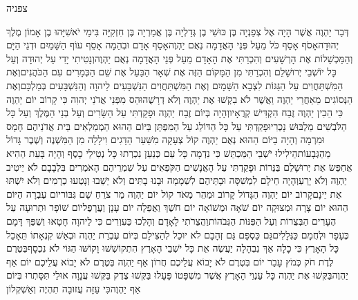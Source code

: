 \documentclass[../main/main.tex]{subfiles}
\begin{document}
\Incipit{}צפניה\par
\vspace{\afterchapskip}
\RTLmulticolcolumns
\begin{multicols}{\ncols}
דְּבַר יַהְוֶה אֲשֶׁר הָיָה אֶל צְפַנְיָה בֶּן כּוּשִׁי בֶן גְּדַלְיָה בֶּן אֲמַרְיָה בֶּן חִזְקִיָּה בִּימֵי יֹאשִׁיָּהוּ בֶן אָמוֹן מֶלֶךְ יְהוּדָה\PreVerseSpace{}אָסֹף אָסֵף כֹּל מֵעַל פְּנֵי הָאֲדָמָה נְאֻם יַהְוֶה\PreVerseSpace{}אָסֵף אָדָם וּבְהֵמָה אָסֵף עוֹף הַשָּׁמַיִם וּדְגֵי הַיָּם וְהַמַּכְשֵׁלוֹת אֶת הָרְשָׁעִים וְהִכְרַתִּי אֶת הָאָדָם מֵעַל פְּנֵי הָאֲדָמָה נְאֻם יַהְוֶה\PreVerseSpace{}וְנָטִיתִי יָדִי עַל יְהוּדָה וְעַל כָּל יוֹשְׁבֵי יְרוּשָׁלֵם וְהִכְרַתִּי מִן הַמָּקוֹם הַזֶּה אֶת שְׁאָר הַבַּעַל אֶת שֵׁם הַכְּמָרִים עִם הַכֹּהֲנִים\PreVerseSpace{}וְאֶת הַמִּשְׁתַּחֲוִים עַל הַגַּגּוֹת לִצְבָא הַשָּׁמָיִם וְאֶת הַמִּשְׁתַּחֲוִים הַנִּשְׁבָּעִים לַיהוָה וְהַנִּשְׁבָּעִים בְּמַלְכָּם\PreVerseSpace{}וְאֶת הַנְּסוֹגִים מֵאַחֲרֵי יַהְוֶה וַאֲשֶׁר לֹא בִקְשׁוּ אֶת יַהְוֶה וְלֹא דְרָשֻׁהוּ\PreVerseSpace{}הַס מִפְּנֵי אֲדֹנַי יְהוִה כִּי קָרוֹב יוֹם יַהְוֶה כִּי הֵכִין יַהְוֶה זֶבַח הִקְדִּישׁ קְרֻאָיו\PreVerseSpace{}וְהָיָה בְּיוֹם זֶבַח יַהְוֶה וּפָקַדְתִּי עַל הַשָּׂרִים וְעַל בְּנֵי הַמֶּלֶךְ וְעַל כָּל הַלֹּבְשִׁים מַלְבּוּשׁ נָכְרִי\PreVerseSpace{}וּפָקַדְתִּי עַל כָּל הַדּוֹלֵג עַל הַמִּפְתָּן בַּיּוֹם הַהוּא הַמְמַלְאִים בֵּית אֲדֹנֵיהֶם חָמָס וּמִרְמָה \ClosedSection{}וְהָיָה בַיּוֹם הַהוּא נְאֻם יַהְוֶה קוֹל צְעָקָה מִשַּׁעַר הַדָּגִים וִילָלָה מִן הַמִּשְׁנֶה וְשֶׁבֶר גָּדוֹל מֵהַגְּבָעוֹת\PreVerseSpace{}הֵילִילוּ יֹשְׁבֵי הַמַּכְתֵּשׁ כִּי נִדְמָה כָּל עַם כְּנַעַן נִכְרְתוּ כָּל נְטִילֵי כָסֶף \ClosedSection{}וְהָיָה בָּעֵת הַהִיא אֲחַפֵּשׂ אֶת יְרוּשָׁלֵם בַּנֵּרוֹת וּפָקַדְתִּי עַל הָאֲנָשִׁים הַקֹּפְאִים עַל שִׁמְרֵיהֶם הָאֹמְרִים בִּלְבָבָם לֹא יֵיטִיב יַהְוֶה וְלֹא יָרֵעַ\PreVerseSpace{}וְהָיָה חֵילָם לִמְשִׁסָּה וּבָתֵּיהֶם לִשְׁמָמָה וּבָנוּ בָתִּים וְלֹא יֵשֵׁבוּ וְנָטְעוּ כְרָמִים וְלֹא יִשְׁתּוּ אֶת יֵינָם\PreVerseSpace{}קָרוֹב יוֹם יַהְוֶה הַגָּדוֹל קָרוֹב וּמַהֵר מְאֹד קוֹל יוֹם יַהְוֶה מַר צֹרֵחַ שָׁם גִּבּוֹר\PreVerseSpace{}יוֹם עֶבְרָה הַיּוֹם הַהוּא יוֹם צָרָה וּמְצוּקָה יוֹם שֹׁאָה וּמְשׁוֹאָה יוֹם חֹשֶׁךְ וַאֲפֵלָה יוֹם עָנָן וַעֲרָפֶל\PreVerseSpace{}יוֹם שׁוֹפָר וּתְרוּעָה עַל הֶעָרִים הַבְּצֻרוֹת וְעַל הַפִּנּוֹת הַגְּבֹהוֹת\PreVerseSpace{}וַהֲצֵרֹתִי לָאָדָם וְהָלְכוּ כַּעִוְרִים כִּי לַיהוָה חָטָאוּ וְשֻׁפַּךְ דָּמָם כֶּעָפָר וּלְחֻמָם כַּגְּלָלִים\PreVerseSpace{}גַּם כַּסְפָּם גַּם זְהָבָם לֹא יוּכַל לְהַצִּילָם בְּיוֹם עֶבְרַת יַהְוֶה וּבְאֵשׁ קִנְאָתוֹ תֵּאָכֵל כָּל הָאָרֶץ כִּי כָלָה אַךְ נִבְהָלָה יַעֲשֶׂה אֵת כָּל יֹשְׁבֵי הָאָרֶץ \ClosedSection{}הִתְקוֹשְׁשׁוּ וָקוֹשּׁוּ הַגּוֹי לֹא נִכְסָף\PreVerseSpace{}בְּטֶרֶם לֶדֶת חֹק כְּמֹץ עָבַר יוֹם בְּטֶרֶם לֹא יָבוֹא עֲלֵיכֶם חֲרוֹן אַף יַהְוֶה בְּטֶרֶם לֹא יָבוֹא עֲלֵיכֶם יוֹם אַף יַהְוֶה\PreVerseSpace{}בַּקְּשׁוּ אֶת יַהְוֶה כָּל עַנְוֵי הָאָרֶץ אֲשֶׁר מִשְׁפָּטוֹ פָּעָלוּ בַּקְּשׁוּ צֶדֶק בַּקְּשׁוּ עֲנָוָה אוּלַי תִּסָּתְרוּ בְּיוֹם אַף יַהְוֶה\PreVerseSpace{}כִּי עַזָּה עֲזוּבָה תִהְיֶה וְאַשְׁקְלוֹן 
\end{multicols}
\end{document}
